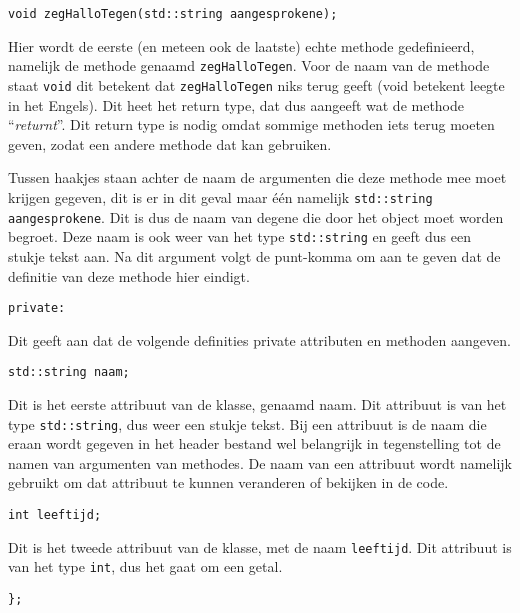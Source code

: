 \documentclass{article}
\begin{document}
\begin{lstlisting}[frame=none]
void zegHalloTegen(std::string aangesprokene);
\end{lstlisting}

Hier wordt de eerste (en meteen ook de laatste) echte methode gedefinieerd, namelijk de methode genaamd \texttt{zegHalloTegen}. Voor de naam van de methode staat \texttt{void} dit betekent dat \texttt{zegHalloTegen} niks terug geeft (void betekent leegte in het Engels). Dit heet het return type, dat dus aangeeft wat de methode “\emph{returnt}”. Dit return type is nodig omdat sommige methoden iets terug moeten geven, zodat een andere methode dat kan gebruiken.

Tussen haakjes staan achter de naam de argumenten die deze methode mee moet krijgen gegeven, dit is er in dit geval maar één namelijk \texttt{std::string aangesprokene}. Dit is dus de naam van degene die door het object moet worden begroet. Deze naam is ook weer van het type \texttt{std::string} en geeft dus een stukje tekst aan. Na dit argument volgt de punt-komma om aan te geven dat de definitie van deze methode hier eindigt.

\begin{lstlisting}[frame=none]
private:
\end{lstlisting}

Dit geeft aan dat de volgende definities private attributen en methoden aangeven.

\begin{lstlisting}[frame=none]
std::string naam; 
\end{lstlisting}

Dit is het eerste attribuut van de klasse, genaamd naam. Dit attribuut is van het type \texttt{std::string}, dus weer een stukje tekst. Bij een attribuut is de naam die eraan wordt gegeven in het header bestand wel belangrijk in tegenstelling tot de namen van argumenten van methodes. De naam van een attribuut wordt namelijk gebruikt om dat attribuut te kunnen veranderen of bekijken in de code.

\begin{lstlisting}[frame=none]
int leeftijd;
\end{lstlisting}

Dit is het tweede attribuut van de klasse, met de naam \texttt{leeftijd}. Dit attribuut is van het type \texttt{int}, dus het gaat om een getal.

\begin{lstlisting}[frame=none]
};
\end{lstlisting}
\end{document}
